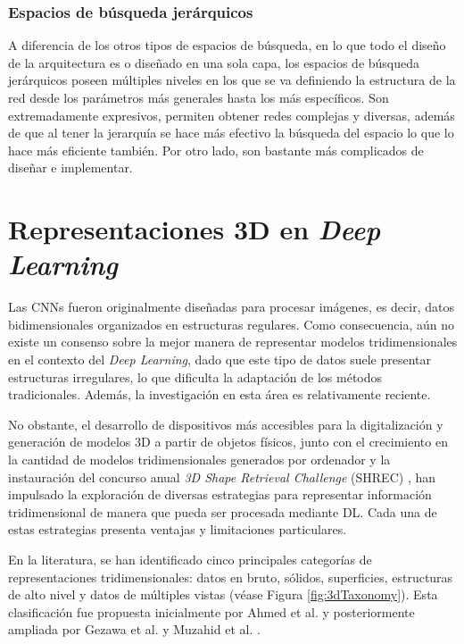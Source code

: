 \subsubsection{Espacios de búsqueda jerárquicos}
A diferencia de los otros tipos de espacios de búsqueda, en lo que todo el diseño de la arquitectura es  o diseñado en una sola capa, los espacios de búsqueda jerárquicos poseen múltiples niveles en los que se va definiendo la estructura de la red desde los parámetros más generales hasta los más específicos. Son extremadamente expresivos, permiten obtener redes complejas y diversas, además de que al tener la jerarquía se hace más efectivo la búsqueda del espacio lo que lo hace más eficiente también. Por otro lado, son bastante más complicados de diseñar e implementar.

\section{Representaciones 3D en \textit{Deep Learning}}
\label{section2:3dreps}
Las CNNs fueron originalmente diseñadas para procesar imágenes, es decir, datos bidimensionales organizados en estructuras regulares. Como consecuencia, aún no existe un consenso sobre la mejor manera de representar modelos tridimensionales en el contexto del \textit{Deep Learning}, dado que este tipo de datos suele presentar estructuras irregulares, lo que dificulta la adaptación de los métodos tradicionales. Además, la investigación en esta área es relativamente reciente.

No obstante, el desarrollo de dispositivos más accesibles para la digitalización y generación de modelos 3D a partir de objetos físicos, junto con el crecimiento en la cantidad de modelos tridimensionales generados por ordenador y la instauración del concurso anual \textit{3D Shape Retrieval Challenge} (SHREC) \cite{noauthor_shrec_nodate, noauthor_3dor2024_nodate}, han impulsado la exploración de diversas estrategias para representar información tridimensional de manera que pueda ser procesada mediante DL. Cada una de estas estrategias presenta ventajas y limitaciones particulares.

En la literatura, se han identificado cinco principales categorías de representaciones tridimensionales: datos en bruto, sólidos, superficies, estructuras de alto nivel y datos de múltiples vistas (véase Figura \ref{fig:3dTaxonomy}). Esta clasificación fue propuesta inicialmente por Ahmed et al. \cite{ahmed_survey_2019} y posteriormente ampliada por Gezawa et al. \cite{gezawa_review_2020} y Muzahid et al. \cite{muzahid_deep_2024}.

